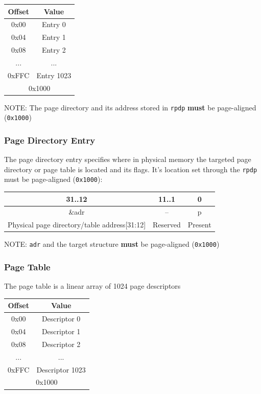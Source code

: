 \documentclass[a4paper,10pt]{article}
\begin{document}
\begin{table}[H]
	\centering
	{
		\begin{tabular}{|c|c|}
\hline
Offset & Value \\
\hline
0x00 & Entry 0 \\
\hline
0x04 & Entry 1 \\
\hline
0x08 & Entry 2 \\
\hline
... & ... \\
\hline
0xFFC & Entry 1023 \\
\hline
\multicolumn{2}{|c|}{0x1000} \\
\hline
		\end{tabular}
	}
\end{table}

NOTE: The page directory and its address stored in \verb|rpdp| \textbf{must} be page-aligned (\verb|0x1000|)

\subsubsection{Page Directory Entry}
The page directory entry specifies where in physical memory the targeted page directory or page table is located and its flags. It's location set through the \verb|rpdp| must be page-aligned (\verb|0x1000|):

\begin{table}[H]
	\centering
	{
		\begin{tabular}{|c|c|c|}
\hline
31..12 & 11..1 & 0 \\
\hline
\&adr & -- & p \\
\hline
Physical page directory/table address[31:12] & Reserved & Present \\
\hline
		\end{tabular}
	}
\end{table}

NOTE: \verb|adr| and the target structure \textbf{must} be page-aligned (\verb|0x1000|)

\subsubsection{Page Table}
The page table is a linear array of 1024 page descriptors

\begin{table}[H]
	\centering
	{
		\begin{tabular}{|c|c|}
\hline
Offset & Value \\
\hline
0x00 & Descriptor 0 \\
\hline
0x04 & Descriptor 1 \\
\hline
0x08 & Descriptor 2 \\
\hline
... & ... \\
\hline
0xFFC & Descriptor 1023 \\
\hline
\multicolumn{2}{|c|}{0x1000} \\
\hline
		\end{tabular}
	}
\end{table}
\end{document}
